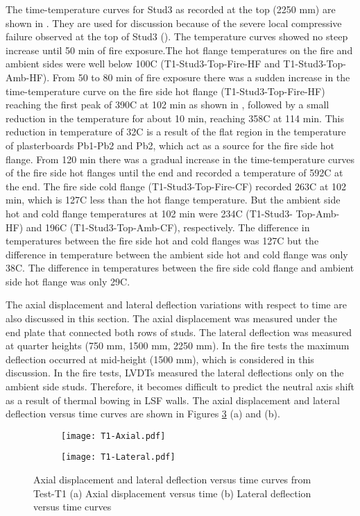 The time-temperature curves for Stud3 as recorded at the top (2250 mm) are shown in . They are used for discussion because of the severe local compressive failure observed at the top of Stud3 (). The temperature curves showed no steep increase until 50 min of fire exposure.The hot flange temperatures on the fire and ambient sides were well below 100\degree C (T1-Stud3-Top-Fire-HF and T1-Stud3-Top-Amb-HF). From 50 to 80 min of fire exposure there was a sudden increase in the time-temperature curve on the fire side hot flange (T1-Stud3-Top-Fire-HF) reaching the first peak of 390\degree C at 102 min as shown in , followed by a small reduction in the temperature for about 10 min, reaching 358\degree C at 114 min. This reduction in temperature of 32\degree C is a result of the flat region in the temperature of plasterboards Pb1-Pb2 and Pb2, which act as a source for the fire side hot flange. From 120 min there was a gradual increase in the time-temperature curves of the fire side hot flanges until the end and recorded a temperature of 592\degree C at the end. The fire side cold flange (T1-Stud3-Top-Fire-CF) recorded 263\degree C at 102 min, which is 127\degree C less than the hot flange temperature. But the ambient side hot and cold flange temperatures at 102 min were 234\degree C (T1-Stud3- Top-Amb-HF) and 196\degree C (T1-Stud3-Top-Amb-CF), respectively. The difference in temperatures between the fire side hot and cold flanges was 127\degree C but the difference in temperature between the ambient side hot and cold flange was only 38\degree C. The difference in temperatures between the fire side cold flange and ambient side hot flange was only 29\degree C.

The axial displacement and lateral deflection variations with respect to time are also discussed in this section. The axial displacement was measured under the end plate that connected both rows of studs. The lateral deflection was measured at quarter heights (750 mm, 1500 mm, 2250 mm). In the fire tests the maximum deflection occurred at mid-height (1500 mm), which is considered in this discussion. In the fire tests, LVDTs measured the lateral deflections only on the ambient side studs. Therefore, it becomes difficult to predict the neutral axis shift as a result of thermal bowing in LSF walls. The axial displacement and lateral deflection versus time curves are shown in Figures \ref{fig:T1-Axial-Lateral} (a) and (b).
\begin{figure}[!htbp]
	\centering
	\begin{subfigure}[b]{0.7\textwidth}
		\centering
		\texttt{[image: T1-Axial.pdf]}
		\caption{}
		\label{subfig:T1-Axial}
	\end{subfigure}
	\begin{subfigure}[b]{0.7\textwidth}
		\centering
		\texttt{[image: T1-Lateral.pdf]}
		\caption{}
		\label{subfig:T1-Lateral}
	\end{subfigure}
	   \caption{Axial displacement and lateral deflection versus time curves from Test-T1 (a) Axial displacement versus time (b) Lateral deflection versus time curves}
	   \label{fig:T1-Axial-Lateral}
\end{figure}

